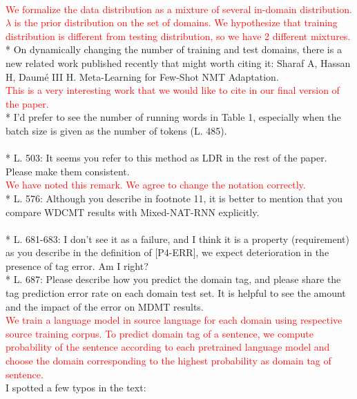 \documentclass[12pt,times,a4paper,twoside]{article}
\newcommand{\fyTodo}[1]{\Todo[FY:]{\textcolor{orange}{#1}}}
\theoremstyle{definition}
\begin{document}
\\
\textcolor{red}{We formalize the data distribution as a mixture of several in-domain distribution. $\lambda$ is the prior distribution on the set of domains. We hypothesize that training distribution is different from testing distribution, so we have 2 different mixtures.}
\\
* On dynamically changing the number of training and test domains, there is a new related work published recently that might worth citing it: Sharaf A, Hassan H, Daumé III H. Meta-Learning for Few-Shot NMT Adaptation.
\\
\textcolor{red}{This is a very interesting work that we would like to cite in our final version of the paper.}
\\
* I’d prefer to see the number of running words in Table 1, especially when the batch size is given as the number of tokens (L. 485).
\\
\fyTodo{to report number of tokens of the datasets}
\\
* L. 503: It seems you refer to this method as LDR in the rest of the paper. Please make them consistent.
\\
\textcolor{red}{We have noted this remark. We agree to change the notation correctly.}
\\
* L. 576: Although you describe in footnote 11, it is better to mention that you compare WDCMT results with Mixed-NAT-RNN explicitly.
\\
\fyTodo{to explicitly compare WDCNMT with Mixed-NAT-RNN}
\\
* L. 681-683: I don’t see it as a failure, and I think it is a property (requirement) as you describe in the definition of [P4-ERR], we expect deterioration in the presence of tag error. Am I right?
\\
* L. 687: Please describe how you predict the domain tag, and please share the tag prediction error rate on each domain test set. It is helpful to see the amount and the impact of the error on MDMT results.
\\
\textcolor{red}{We train a language model in source language for each domain using respective source training corpus. To predict domain tag of a sentence, we compute probability of the sentence according to each pretrained language model and choose the domain corresponding to the highest probability as domain tag of sentence.} \fyTodo{to compute error rate of domain prediction over each test set}
\\
I spotted a few typos in the text:
\\
\end{document}
